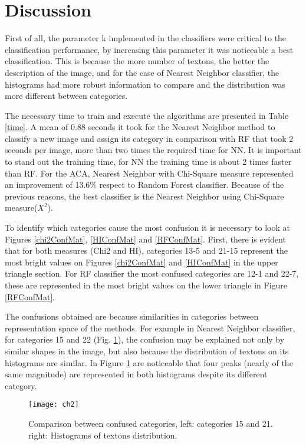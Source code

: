 \documentclass[10pt,twocolumn,letterpaper]{article}
\begin{document}
\section{Discussion}
First of all, the parameter k implemented in the classifiers were critical to the classification performance, by increasing this parameter it was noticeable a best classification. This is because the more number of textons, the better the description of the image, and for the case of Nearest Neighbor classifier, the histograms had more robust information to compare and the distribution was more different between categories.

The necessary time to train and execute the algorithms are presented in Table \ref{time}. A mean of 0.88 seconds it took for the Nearest Neighbor method to classify a new image and assign its category in comparison with RF that took 2 seconds per image, more than two times the required time for NN. It is important to stand out the training time, for NN the training time is about 2 times faster than RF. For the ACA, Nearest Neighbor with Chi-Square measure represented an improvement of 13.6\% respect to Random Forest classifier. Because of the previous reasons, the best classifier is the Nearest Neighbor using Chi-Square measure($X^{2}$).

To identify which categories cause the most confusion it is necessary to look at Figures \ref{chi2ConfMat}, \ref{HIConfMat} and \ref{RFConfMat}. First, there is evident that for both measures (Chi2 and HI), categories 13-5 and 21-15 represent the most bright values on Figures \ref{chi2ConfMat} and \ref{HIConfMat} in the upper triangle section. For RF classifier the most confused categories are 12-1 and 22-7, these are represented in the most bright values on the lower triangle in Figure \ref{RFConfMat}.

The confusions obtained are because similarities in categories between representation space of the methods. For example in Nearest Neighbor classifier, for categories 15 and 22 (Fig. \ref{confused}), the confusion may be explained not only by similar shapes in the image, but also because the distribution of textons on its histograms are similar. In Figure \ref{confused} are noticeable that four peaks (nearly of the same magnitude) are represented in both histograms despite its different category.
\begin{figure}[h]
\centering
\texttt{[image: ch2]}
\caption{Comparison between confused categories, left: categories 15 and 21. right: Histograms of textons distribution.}
\label{confused}
\centering
\end{figure}
\end{document}
